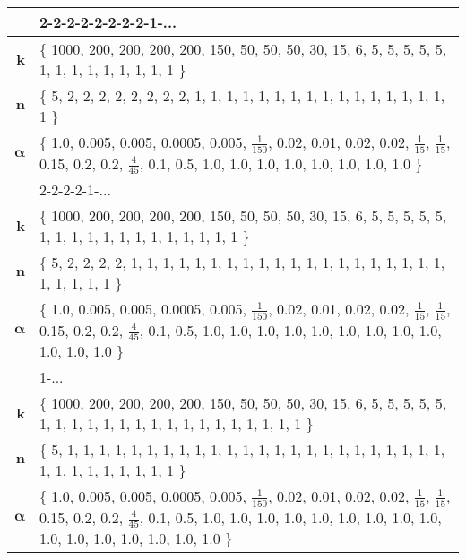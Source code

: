 {\begin{table*}[tbp]
{\begin{tabular}{rp{11.1cm}}
       \midrule
        & 2-2-2-2-2-2-2-2-1-... \\
        \midrule
        $\bm{k} $ & \{ 1000, 200, 200, 200, 200, 150, 50, 50, 50, 30, 15, 6, 5, 5, 5, 5, 5, 1, 1, 1, 1, 1, 1, 1, 1, 1 \} \\
        $\bm{n} $ & \{ 5, 2, 2, 2, 2, 2, 2, 2, 2, 1, 1, 1, 1, 1, 1, 1, 1, 1, 1, 1, 1, 1, 1, 1, 1, 1 \}  \\
        $\bm{\alpha}$ & \{ 1.0, 0.005, 0.005, 0.0005, 0.005, $\frac{1}{150}$, 0.02,  0.01, 0.02, 0.02, $\frac{1}{15}$,  $\frac{1}{15}$, 0.15, 0.2, 0.2, $\frac{4}{45}$, 0.1, 0.5, 1.0, 1.0, 1.0, 1.0, 1.0, 1.0, 1.0, 1.0 \} \\
       
       \midrule
        & 2-2-2-2-1-... \\
        \midrule
        $\bm{k} $ & \{ 1000, 200, 200, 200, 200, 150, 50, 50, 50, 30, 15, 6, 5, 5, 5, 5, 5, 1, 1, 1, 1, 1, 1, 1, 1, 1, 1, 1, 1, 1 \} \\
        $\bm{n} $ & \{ 5, 2, 2, 2, 2, 1, 1, 1, 1, 1, 1, 1, 1, 1, 1, 1, 1, 1, 1, 1, 1, 1, 1, 1, 1, 1, 1, 1, 1, 1 \} \\
        $\bm{\alpha}$ & \{ 1.0, 0.005, 0.005, 0.0005, 0.005, $\frac{1}{150}$, 0.02, 0.01, 0.02, 0.02, $\frac{1}{15}$, $\frac{1}{15}$, 0.15, 0.2, 0.2, $\frac{4}{45}$, 0.1, 0.5, 1.0, 1.0, 1.0, 1.0, 1.0, 1.0, 1.0, 1.0, 1.0, 1.0, 1.0, 1.0 \}  \\
        
        \midrule
        & 1-... \\
        \midrule
        $\bm{k} $ & \{ 1000, 200, 200, 200, 200, 150, 50, 50, 50, 30, 15, 6, 5, 5, 5, 5, 5, 1, 1, 1, 1, 1, 1, 1, 1, 1, 1, 1, 1, 1, 1, 1, 1, 1 \} \\
        $\bm{n} $ & \{ 5, 1, 1, 1, 1, 1, 1, 1, 1, 1, 1, 1, 1, 1, 1, 1, 1, 1, 1, 1, 1, 1, 1, 1, 1, 1, 1, 1, 1, 1, 1, 1, 1, 1 \}  \\
        $\bm{\alpha}$ & \{ 1.0, 0.005, 0.005, 0.0005, 0.005, $\frac{1}{150}$, 0.02, 0.01, 0.02, 0.02, $\frac{1}{15}$, $\frac{1}{15}$, 0.15, 0.2, 0.2, $\frac{4}{45}$, 0.1, 0.5, 1.0, 1.0, 1.0, 1.0, 1.0, 1.0, 1.0, 1.0, 1.0, 1.0, 1.0, 1.0, 1.0, 1.0, 1.0, 1.0 \} \\
        \bottomrule
    \end{tabular}%
	}
    \label{tbl:appn}
\end{table*}

}
